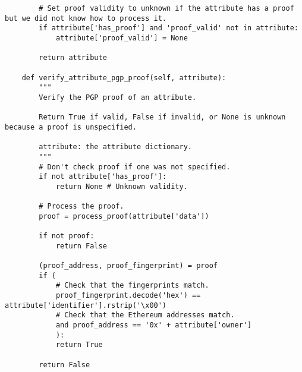 \documentclass[12pt]{report}
\begin{document}
\begin{lstlisting}
        # Set proof validity to unknown if the attribute has a proof but we did not know how to process it.
        if attribute['has_proof'] and 'proof_valid' not in attribute:
            attribute['proof_valid'] = None

        return attribute

    def verify_attribute_pgp_proof(self, attribute):
        """
        Verify the PGP proof of an attribute.

        Return True if valid, False if invalid, or None is unknown because a proof is unspecified.

        attribute: the attribute dictionary.
        """
        # Don't check proof if one was not specified.
        if not attribute['has_proof']:
            return None # Unknown validity.

        # Process the proof.
        proof = process_proof(attribute['data'])

        if not proof:
            return False

        (proof_address, proof_fingerprint) = proof
        if (
            # Check that the fingerprints match.
            proof_fingerprint.decode('hex') == attribute['identifier'].rstrip('\x00')
            # Check that the Ethereum addresses match.
            and proof_address == '0x' + attribute['owner']
            ):
            return True

        return False
	\end{lstlisting}
	
\end{document}
